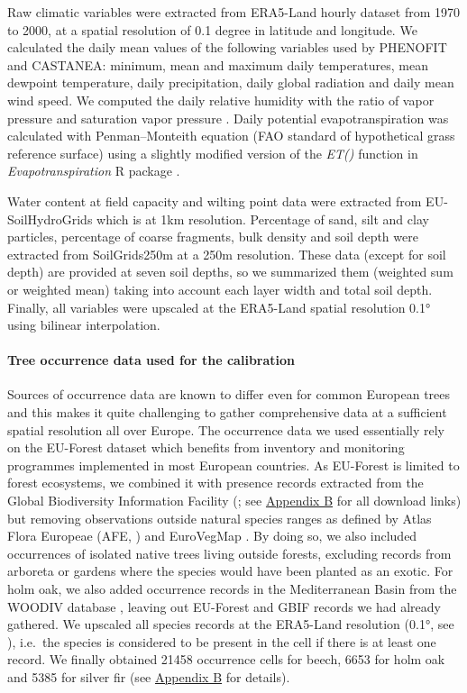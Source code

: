 Raw climatic variables were extracted from ERA5-Land hourly dataset
\citep{MunozSabater2021} from 1970 to 2000, at a
spatial resolution of 0.1 degree in latitude and longitude. We
calculated the daily mean values of the following variables used by
PHENOFIT and CASTANEA: minimum, mean and maximum daily temperatures,
mean dewpoint temperature, daily precipitation, daily global radiation
and daily mean wind speed. We computed the daily relative humidity with
the ratio of vapor pressure and saturation vapor pressure \citep[both
calculated with Clausius-Clapeyron equation) using \emph{humidity} R
package,][]{Cai2019}. Daily potential
evapotranspiration was calculated with Penman--Monteith equation (FAO
standard of hypothetical grass reference surface) using a slightly
modified version of the \emph{ET()} function in
\emph{Evapotranspiration} R package \citep{Guo2016}.

Water content at field capacity and wilting point data were extracted
from EU-SoilHydroGrids \citep{Toth2017} which is at 1km resolution. Percentage of sand, silt and
clay particles, percentage of coarse fragments, bulk density and soil
depth were extracted from SoilGrids250m
\citep{Hengl2017} at a 250m
resolution. These data (except for soil depth) are provided at seven
soil depths, so we summarized them (weighted sum or weighted mean)
taking into account each layer width and total soil depth. Finally, all
variables were upscaled at the ERA5-Land spatial resolution 0.1° using
bilinear interpolation.

\paragraph{Tree occurrence data used for the
calibration}\label{sec:occurrencedata}

Sources of occurrence data are known to differ even for common European
trees \citep{Duputie2014}
and this makes it quite challenging to gather comprehensive data at a
sufficient spatial resolution all over Europe. The occurrence data we
used essentially rely on the EU-Forest dataset
\citep{Mauri2017} which
benefits from inventory and monitoring programmes implemented in most
European countries. As EU-Forest is limited to forest ecosystems, we
combined it with presence records extracted from the Global Biodiversity
Information Facility (\citealp{GBIF2022}; see
\hyperref[chap1:appendixB]{Appendix B} for all download links) but
removing observations outside natural species ranges as defined by Atlas
Flora Europeae (AFE, \citealp{AFE2005}) and EuroVegMap \citep{EVM2003}. By doing so, we also included occurrences of
isolated native trees living outside forests, excluding records from
arboreta or gardens where the species would have been planted as an
exotic. For holm oak, we also added occurrence records in the
Mediterranean Basin from the WOODIV database
\citep{Monnet2021}, leaving
out EU-Forest and GBIF records we had already gathered. We upscaled all
species records at the ERA5-Land resolution (0.1°, see
), i.e.~the species
is considered to be present in the cell if there is at least one record.
We finally obtained 21458 occurrence cells for beech, 6653 for holm oak
and 5385 for silver fir (see \hyperref[chap1:appendixB]{Appendix B} for details).

